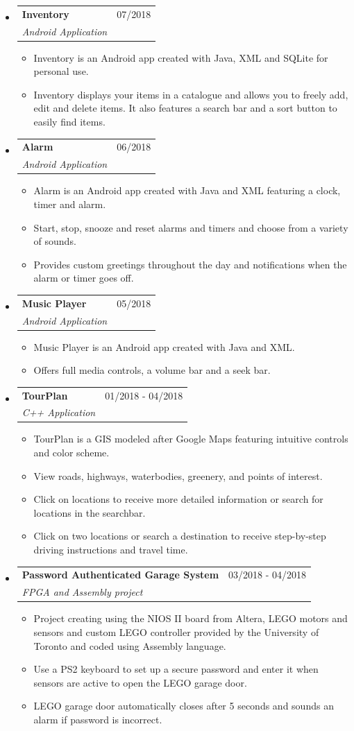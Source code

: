 \documentclass[letterpaper,11pt]{article}
\makeatletter
\newcommand{\resitem}[1]{\item #1 \vspace{-2pt}}
\newcommand{\ressubheading}[4]{
\begin{tabular*}{7.0in}{l@{\extracolsep{\fill}}r}
		\textbf{#1} & #2 \\
		\textit{#3} & \textit{#4} \\
\end{tabular*}\vspace{-6pt}}
\makeatother
\begin{document}
\begin{itemize}
    \item
    \ressubheading{Inventory}{07/2018}{Android Application}{}
    \begin{itemize}
		\resitem{Inventory is an Android app created with Java, XML and SQLite for personal use.}
        \resitem{Inventory displays your items in a catalogue and allows you to freely add, edit and delete items. It also features a search bar and a sort button to easily find items.}
    \end{itemize}
    
    \item
    \ressubheading{Alarm}{06/2018}{Android Application}{}
    \begin{itemize}
		\resitem{Alarm is an Android app created with Java and XML featuring a clock, timer and alarm.}
        \resitem{Start, stop, snooze and reset alarms and timers and choose from a variety of sounds.}
        \resitem{Provides custom greetings throughout the day and notifications when the alarm or timer goes off.}
    \end{itemize}
 
 	\item
    \ressubheading{Music Player}{05/2018}{Android Application}{}
    \begin{itemize}
		\resitem{Music Player is an Android app created with Java and XML.}
        \resitem{Offers full media controls, a volume bar and a seek bar.}
    \end{itemize}
  
    \item
      \ressubheading{TourPlan}{01/2018 - 04/2018}{C++ Application}{}
      \begin{itemize}
          \resitem{TourPlan is a GIS modeled after Google Maps featuring intuitive controls and color scheme.}
          \resitem{View roads, highways, waterbodies, greenery, and points of interest.}
          \resitem{Click on locations to receive more detailed information or search for locations in the searchbar.}
          \resitem{Click on two locations or search a destination to receive step-by-step driving instructions and travel time.}
      \end{itemize}
      
    \item
      \ressubheading{Password Authenticated Garage System}{03/2018 - 04/2018}		{FPGA and Assembly project}{}
      \begin{itemize}
          \resitem{Project creating using the NIOS II board from Altera, LEGO motors and sensors and custom LEGO controller provided by the University of Toronto and coded using Assembly language.}
          \resitem{Use a PS2 keyboard to set up a secure password and enter it when sensors are active to open the LEGO garage door.}
          \resitem{LEGO garage door automatically closes after 5 seconds and sounds an alarm if password is incorrect.}
      \end{itemize}  
  

\end{itemize}
\end{document}
